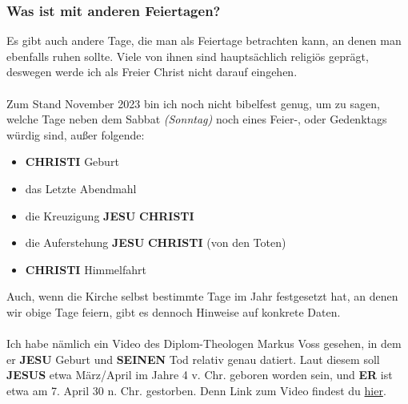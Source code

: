 \documentclass[12pt,a5paper]{article}
\newcommand{\Christi}[0]{\textbf{CHRISTI}}
\newcommand{\Er}[0]{\textbf{ER}}
\newcommand{\Jesus}[0]{\textbf{JESUS}}
\newcommand{\Jesu}[0]{\textbf{JESU}}
\newcommand{\Seinen}[0]{\textbf{SEINEN}}
\begin{document}
	\subsubsection{Was ist mit anderen Feiertagen?}
		Es gibt auch andere Tage,
		die man als Feiertage betrachten kann,
		an denen man ebenfalls ruhen sollte.
		Viele von ihnen sind haupts\"achlich religi\"os gepr\"agt,
		deswegen werde ich als Freier Christ nicht darauf eingehen.
		\\
		\\
		Zum Stand November 2023 bin ich noch nicht bibelfest genug,
		um zu sagen,
		welche Tage neben dem Sabbat \textit{(Sonntag)} noch eines Feier-,
		oder Gedenktags w\"urdig sind,
		au{\ss}er folgende:
		\begin{itemize}[noitemsep]
			\item {\Christi} Geburt
			\item das Letzte Abendmahl
			\item die Kreuzigung {\Jesu} {\Christi}
			\item die Auferstehung {\Jesu} {\Christi} (von den Toten)
			\item {\Christi} Himmelfahrt
		\end{itemize}
		Auch,
		wenn die Kirche selbst bestimmte Tage im Jahr festgesetzt hat,
		an denen wir obige Tage feiern,
		gibt es dennoch Hinweise auf konkrete Daten.
		\\
		\\
		Ich habe n\"amlich ein Video des Diplom-Theologen Markus Voss gesehen,
		in dem er {\Jesu} Geburt und {\Seinen} Tod relativ genau datiert.
		Laut diesem soll {\Jesus} etwa M\"arz/April im Jahre 4 v. Chr. geboren worden sein,
		und {\Er} ist etwa am 7. April 30 n. Chr. gestorben.
		Denn Link zum Video findest du \href{https://www.youtube.com/watch?v=Bv3Rfd1oZ9I}{hier}.
\end{document}
